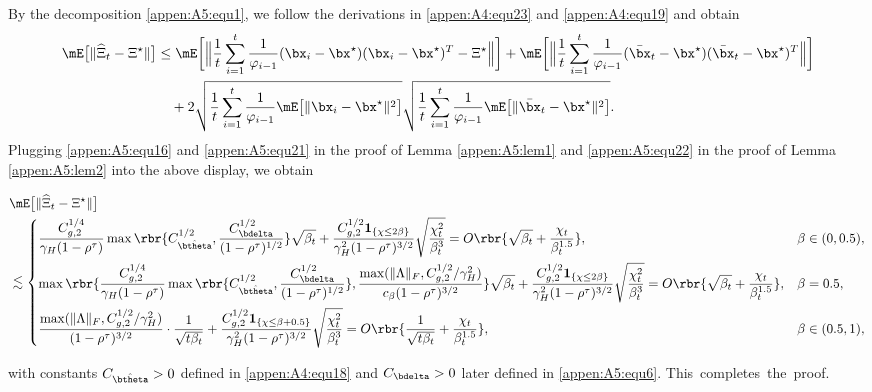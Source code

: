 By the decomposition \eqref{appen:A5:equ1}, we follow the derivations in \eqref{appen:A4:equ23} and \eqref{appen:A4:equ19} and obtain
\begin{align*}
\mE\big[\|\widehat{\Xi}_t-\Xi^\star\|\big]&\leq
\mE\bigg[\Big\|\frac{1}{t}\sum_{i=1}^t\frac{1}{\varphi_{i-1}}(\bx_i-\bx^\star)(\bx_i-\bx^\star)^T-\Xi^\star\Big\|\bigg]+\mE\bigg[\Big\|\frac{1}{t}\sum_{i=1}^t\frac{1}{\varphi_{i-1}}(\bar{\bx}_t-\bx^\star)(\bar{\bx}_t-\bx^\star)^T\Big\|\bigg]\\
&\quad +2\sqrt{\frac{1}{t}\sum_{i=1}^t\frac{1}{\varphi_{i-1}}\mE\big[\|\bx_i-\bx^\star\|^2\big]}\sqrt{\frac{1}{t}\sum_{i=1}^t\frac{1}{\varphi_{i-1}}\mE\big[\|\bar{\bx}_t-\bx^\star\|^2\big]}.
\end{align*}
Plugging \eqref{appen:A5:equ16} and \eqref{appen:A5:equ21} in the proof of Lemma \ref{appen:A5:lem1} and \eqref{appen:A5:equ22} in the proof of Lemma \ref{appen:A5:lem2} into the above display, we obtain
\begin{scriptsize}
\begin{align*}
& \mE\big[\|\widehat{\Xi}_t-\Xi^\star\|\big]\\
&\lesssim \begin{dcases}
\frac{C_{g,2}^{1/4}}{\gamma_H(1-\rho^\tau)}\max \rbr{C_{\hat{\btheta}}^{1/2}, \frac{C_{\bdelta}^{1/2}}{(1-\rho^\tau)^{1/2}}}\sqrt{\beta_t} + \frac{C_{g,2}^{1/2}\mathbf{1}_{\{\chi\leq 2\beta\}}}{\gamma_H^2(1-\rho^\tau)^{3/2}}\sqrt{\frac{\chi_t^2}{\beta_t^{3}}} = O\rbr{\sqrt{\beta_t} + \frac{\chi_t}{\beta_t^{1.5}}}, &\beta\in(0,0.5),\\
\max\rbr{\frac{C_{g,2}^{1/4}}{\gamma_H(1-\rho^\tau)}\max\rbr{C_{\hat{\btheta}}^{1/2}, \frac{C_{\bdelta}^{1/2}}{(1-\rho^\tau)^{1/2}}}, \frac{\max(\|\Lambda\|_F, C_{g,2}^{1/2}/\gamma_H^2)}{c_{\beta}(1-\rho^\tau)^{3/2}}}\sqrt{\beta_t} + \frac{C_{g,2}^{1/2}\mathbf{1}_{\{\chi\leq 2\beta\}}}{\gamma_H^2(1-\rho^\tau)^{3/2}}\sqrt{\frac{\chi_t^2}{\beta_t^{3}}} = O\rbr{\sqrt{\beta_t} + \frac{\chi_t}{\beta_t^{1.5}}}, &\beta = 0.5,\\
\frac{\max(\|\Lambda\|_F, C_{g,2}^{1/2}/\gamma_H^2)}{(1-\rho^\tau)^{3/2}}\cdot\frac{1}{\sqrt{t\beta_t}} + \frac{C_{g,2}^{1/2}\mathbf{1}_{\{\chi\leq\beta+0.5\}}}{\gamma_H^2(1-\rho^\tau)^{3/2} }\sqrt{\frac{\chi_t^2}{\beta_t^{3}}}= O\rbr{\frac{1}{\sqrt{t\beta_t}} + \frac{\chi_t}{\beta_t^{1.5}}}, &\beta\in(0.5,1),
\end{dcases}
\end{align*}
\end{scriptsize}
\hskip-3.5pt with constants $C_{\hat{\btheta}}>0$ defined in \eqref{appen:A4:equ18} and $C_{\bdelta}>0$ later defined in \eqref{appen:A5:equ6}. This~completes~the~proof.


